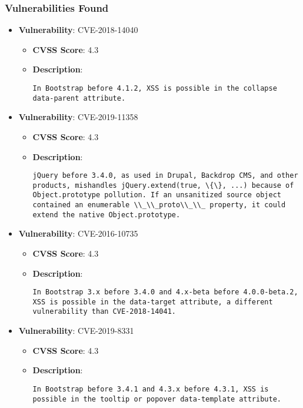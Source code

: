 \documentclass{article}
\begin{document}
\subsubsection*{Vulnerabilities Found}

\begin{itemize}
    
        \item \textbf{Vulnerability}: CVE-2018-14040
        \begin{itemize}
            \item \textbf{CVSS Score}:  4.3 
            \item \textbf{Description}:
            \parbox[t]{0.9\linewidth}{
                \verb|In Bootstrap before 4.1.2, XSS is possible in the collapse data-parent attribute.|
            }
        \end{itemize}
    
        \item \textbf{Vulnerability}: CVE-2019-11358
        \begin{itemize}
            \item \textbf{CVSS Score}:  4.3 
            \item \textbf{Description}:
            \parbox[t]{0.9\linewidth}{
                \verb|jQuery before 3.4.0, as used in Drupal, Backdrop CMS, and other products, mishandles jQuery.extend(true, \{\}, ...) because of Object.prototype pollution. If an unsanitized source object contained an enumerable \\_\\_proto\\_\\_ property, it could extend the native Object.prototype.|
            }
        \end{itemize}
    
        \item \textbf{Vulnerability}: CVE-2016-10735
        \begin{itemize}
            \item \textbf{CVSS Score}:  4.3 
            \item \textbf{Description}:
            \parbox[t]{0.9\linewidth}{
                \verb|In Bootstrap 3.x before 3.4.0 and 4.x-beta before 4.0.0-beta.2, XSS is possible in the data-target attribute, a different vulnerability than CVE-2018-14041.|
            }
        \end{itemize}
    
        \item \textbf{Vulnerability}: CVE-2019-8331
        \begin{itemize}
            \item \textbf{CVSS Score}:  4.3 
            \item \textbf{Description}:
            \parbox[t]{0.9\linewidth}{
                \verb|In Bootstrap before 3.4.1 and 4.3.x before 4.3.1, XSS is possible in the tooltip or popover data-template attribute.|
            }
        \end{itemize}
    

\end{itemize}
\end{document}
